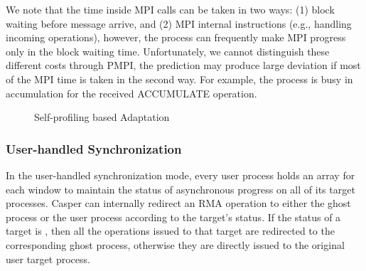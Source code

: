 We note that the time inside MPI calls can be taken in two ways: (1) block
waiting before message arrive, and (2) MPI internal instructions
(e.g., handling incoming operations), however, the process can frequently
make MPI progress only in the block waiting time. Unfortunately, we cannot
distinguish these different costs through PMPI, the prediction may produce
large deviation if most of the MPI time is taken in the second way. For
example, the process is busy in accumulation for the received ACCUMULATE
operation.

\begin{figure}%
\centering
{}
\caption{Self-profiling based Adaptation}
\label{fig:deg-adpt}
\end{figure}

\subsubsection{User-handled Synchronization}

In the user-handled synchronization mode, every user process holds an
array for each window to maintain the status of asynchronous progress on
all of its target processes. Casper can internally redirect an RMA operation
to either the ghost process or the user process according to the target's
status. If the status of a target is , then all the operations
issued to that target are redirected to the corresponding ghost process,
otherwise they are directly issued to the original user target process.

